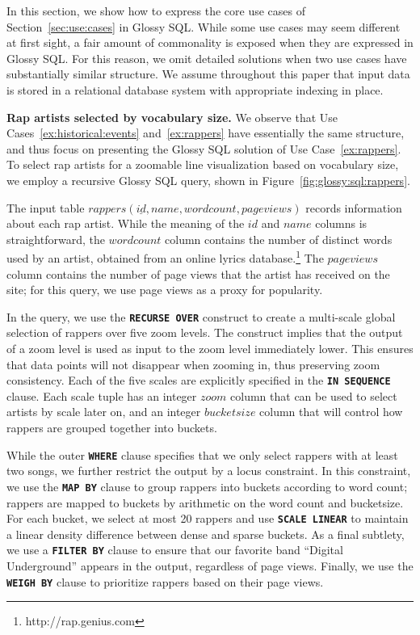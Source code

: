 \documentclass[11pt, oneside]{report}
\newcommand{\minisec}[1]{\noindent\textbf{#1.}}
\begin{document}
{In this section, we show how to express the core use cases of Section~\ref{sec:use:cases} in Glossy SQL. While some use cases may seem different at first sight, a fair amount of commonality is exposed when they are expressed in Glossy SQL. For this reason, we omit detailed solutions when two use cases have substantially similar structure. 
We assume throughout this paper that input data is stored in a relational database system with appropriate indexing in place.  

\minisec{Rap artists selected by vocabulary size}
We observe that Use Cases~\ref{ex:historical:events} and~\ref{ex:rappers} have essentially the same structure, and thus focus on presenting the Glossy SQL solution of Use Case~\ref{ex:rappers}.
To select rap artists for a zoomable line visualization based on vocabulary size, we employ a recursive Glossy SQL query, shown in Figure~\ref{fig:glossy:sql:rappers}. 

The input table $rappers(\underline{id}, name, wordcount, pageviews)$ records information about each rap artist. While the meaning of the $id$ and $name$ columns is straightforward, the $wordcount$ column contains the number of distinct words used by an artist, obtained from an online lyrics database.\footnote{http://rap.genius.com} The $pageviews$ column contains the number of page views that the artist has received on the site; for this query, we use page views as a proxy for popularity.

In the query, we use the \textbf{\texttt{RECURSE OVER}} construct to create a multi-scale global selection of rappers over five zoom levels. The construct implies that the output of a zoom level is used as input to the zoom level immediately lower. This ensures that data points will not disappear when zooming in, thus preserving zoom consistency. Each of the five scales are explicitly specified in the \textbf{\texttt{IN SEQUENCE}} clause. Each scale tuple has an integer $zoom$ column that can be used to select artists by scale later on, and an integer $bucketsize$ column that will control how rappers are grouped together into buckets.

While the outer \textbf{\texttt{WHERE}} clause specifies that we only select rappers with at least two songs, we further restrict the output by a locus constraint. In this constraint, we use the \textbf{\texttt{MAP BY}} clause to group rappers into buckets according to word count; rappers are mapped to buckets by arithmetic on the word count and bucketsize. For each bucket, we select at most 20 rappers and use \textbf{\texttt{SCALE LINEAR}} to maintain a linear density difference between dense and sparse buckets. As a final subtlety, we use a \textbf{\texttt{FILTER BY}} clause to ensure that our favorite band ``Digital Underground''  appears in the output, regardless of page views. Finally, we use the \textbf{\texttt{WEIGH BY}} clause to prioritize rappers based on their page views. 

}
\end{document}
